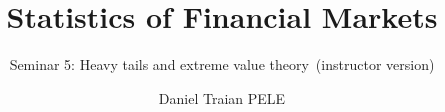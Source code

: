 \title[Statistics of Financial Markets]{Statistics of Financial Markets}
\subtitle{Seminar 5: Heavy tails and extreme value theory\ifsolutions\ (instructor version)\fi}
\author[D.T. Pele]{Daniel Traian PELE}
\date{}

\providecommand{\sfmapplink}[3]{\hypertarget{#2}{}\hyperlink{#1}{\beamergotobutton{#3}}}  %
\providecommand{\sfmappback}[2]{\begin{tikzpicture}[remember picture,overlay]\node[anchor=south east] at ([xshift=-3mm,yshift=7mm]current page.south east){\hyperlink{#1}{\beamerreturnbutton{#2}}};\end{tikzpicture}}  %
\providecommand{\sfmchlink}[2]{\href{#1}{#2}}  %
\providecommand{\sfmchlinkt}[2]{\href{#1}{\usebeamercolor[fg]{frametitle}#2}}  %


